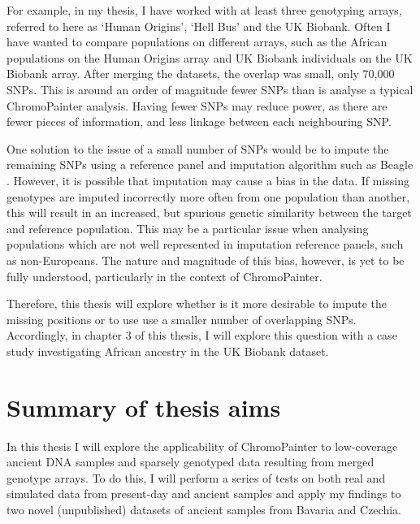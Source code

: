 For example, in my thesis, I have worked with at least three genotyping arrays, referred to here as `Human Origins', `Hell Bus' and the UK Biobank. Often I have wanted to compare populations on different arrays, such as the African populations on the Human Origins array and UK Biobank individuals on the UK Biobank array. After merging the datasets, the overlap was small, only 70,000 SNPs. This is around an order of magnitude fewer SNPs than is analyse a typical ChromoPainter analysis. Having fewer SNPs may reduce power, as there are fewer pieces of information, and less linkage between each neighbouring SNP.

One solution to the issue of a small number of SNPs would be to impute the remaining SNPs using a reference panel and imputation algorithm such as Beagle \cite{Browning2016}. However, it is possible that imputation may cause a bias in the data. If missing genotypes are imputed incorrectly more often from one population than another, this will result in an increased, but spurious genetic similarity between the target and reference population. This may be a particular issue when analysing populations which are not well represented in imputation reference panels, such as non-Europeans. The nature and magnitude of this bias, however, is yet to be fully understood, particularly in the context of ChromoPainter.  

Therefore, this thesis will explore whether is it more desirable to impute the missing positions or to use use a smaller number of overlapping SNPs. Accordingly, in chapter 3 of this thesis, I will explore this question with a case study investigating African ancestry in the UK Biobank dataset. 
 
\section{Summary of thesis aims}

In this thesis I will explore the applicability of ChromoPainter to low-coverage ancient DNA samples and sparsely genotyped data resulting from merged genotype arrays. To do this, I will perform a series of tests on both real and simulated data from present-day and ancient samples and apply my findings to two novel (unpublished) datasets of ancient samples from Bavaria and Czechia. 

